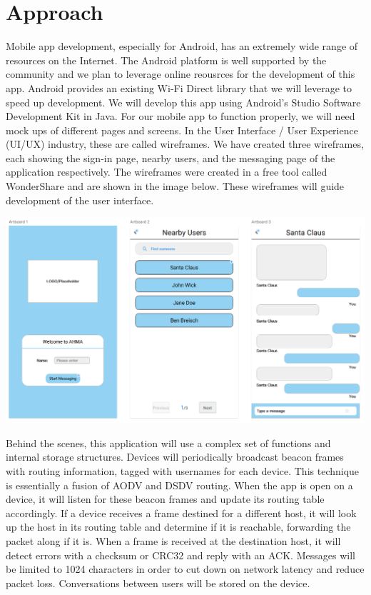 \documentclass[10pt]{article}
\begin{document}
\section{Approach} %
   Mobile app development, especially for Android, has an extremely wide range of resources on the Internet. The Android platform is well supported by the community and we plan to leverage online reousrces for the development of this app. Android provides an existing Wi-Fi Direct library that we will leverage to speed up development. We will develop this app using Android's Studio Software Development Kit in Java. For our mobile app to function properly, we will need mock ups of different pages and screens. In the User Interface / User Experience (UI/UX) industry, these are called wireframes. We have created three wireframes, each showing the sign-in page, nearby users, and the messaging page of the application respectively. The wireframes were created in a free tool called WonderShare and are shown in the image below. These wireframes will guide development of the user interface.\\
   \begin{center}
   \includegraphics[scale=0.5]{wireframe.png} \\
   \end{center}
   Behind the scenes, this application will use a complex set of functions and internal storage structures. Devices will periodically broadcast beacon frames with routing information, tagged with usernames for each device. This technique is essentially a fusion of AODV and DSDV routing. When the app is open on a device, it will listen for these beacon frames and update its routing table accordingly. If a device receives a frame destined for a different host, it will look up the host in its routing table and determine if it is reachable, forwarding the packet along if it is. When a frame is received at the destination host, it will detect errors with a checksum or CRC32 and reply with an ACK. Messages will be limited to 1024 characters in order to cut down on network latency and reduce packet loss. Conversations between users will be stored on the device.
   
\end{document}
